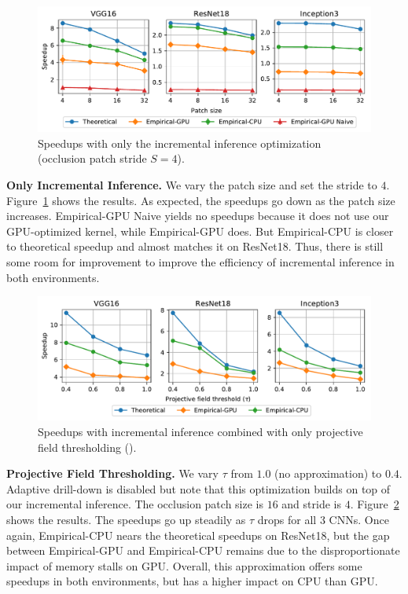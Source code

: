 \begin{figure}[t]
\includegraphics[width=\columnwidth]{images/5_2_1_edited}
\vspace{-8mm}
\caption{Speedups with only the incremental inference optimization (occlusion patch stride $S=4$).}
\label{fig:5_2_1_edited}
\end{figure}

\vspace{2mm}
\noindent \textbf{Only Incremental Inference.} 
We vary the patch size and set the stride to $4$. Figure~\ref{fig:5_2_1_edited} shows the results. As expected, the speedups go down as the patch size increases. Empirical-GPU Naive yields no speedups because it does not use our GPU-optimized kernel, while Empirical-GPU does. But Empirical-CPU is closer to theoretical speedup and almost matches it on ResNet18. Thus, there is still some room for improvement to improve the efficiency of incremental inference in both environments.


\begin{figure}[t]
\includegraphics[width=\columnwidth]{images/5_2_2_edited}
\vspace{-8mm}
\caption{Speedups with incremental inference combined with only projective field thresholding ().}
\label{fig:5_2_2_edited}
\end{figure}

\vspace{2mm}
\noindent \textbf{Projective Field Thresholding.} We vary $\tau$ from $1.0$ (no approximation) to $0.4$. Adaptive drill-down is disabled but note that this optimization builds on top of our incremental inference. The occlusion patch size is $16$ and stride is $4$. Figure~\ref{fig:5_2_2_edited} shows the results. The speedups go up steadily as $\tau$ drops for all 3 CNNs. Once again, Empirical-CPU nears the theoretical speedups on ResNet18, but the gap between Empirical-GPU and Empirical-CPU remains due to the disproportionate impact of memory stalls on GPU. Overall, this approximation offers some speedups in both environments, but has a higher impact on CPU than GPU.

